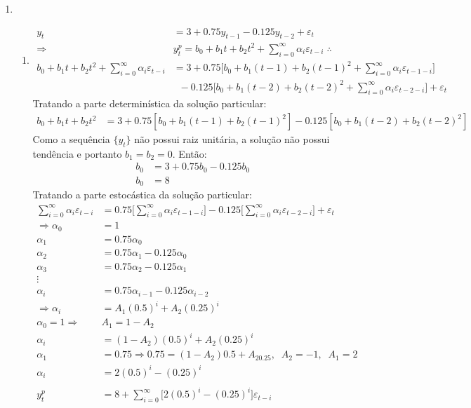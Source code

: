 \begin{enumerate}
		\begin{enumerate}
			\item %
				\begin{enumerate}
					\item %
					\begin{align*}
						y_t&=3+0.75y_{t-1}-0.125y_{t-2}+\varepsilon_t\\
						\Rightarrow & y_t^p=b_0+b_1t+b_2t^2+\sum\limits_{i=0}^{\infty}\alpha_i\varepsilon_{t-i}\;\therefore\\
						b_0+b_1t+b_2t^2+\sum\limits_{i=0}^{\infty}\alpha_i\varepsilon_{t-i}&=3+0.75\Bigg[b_0+b_1(t-1)+b_2(t-1)^2+\sum\limits_{i=0}^{\infty}\alpha_i\varepsilon_{t-1-i}\Bigg]\\
						&\;\;-0.125\Bigg[b_0+b_1(t-2)+b_2(t-2)^2+\sum\limits_{i=0}^{\infty}\alpha_i\varepsilon_{t-2-i}\Bigg]+\varepsilon_t						
					\end{align*}
					Tratando a parte determinística da solução particular:
					\begin{align*}
							b_0+b_1t+b_2t^2&=3+0.75[b_0+b_1(t-1)+b_2(t-1)^2]-0.125[b_0+b_1(t-2)+b_2(t-2)^2]
					\end{align*}
					Como a sequência $\{y_t\}$ não possui raiz unitária, a solução não possui tendência e portanto $b_1=b_2=0$. Então:
					\begin{align*}
						b_0&=3+0.75b_0-0.125b_0\\
						b_0&=8
					\end{align*}
					Tratando a parte estocástica da solução particular:
					\begin{align*}
						\sum\limits_{i=0}^{\infty}\alpha_i\varepsilon_{t-i}&=0.75\Bigg[\sum\limits_{i=0}^{\infty}\alpha_i\varepsilon_{t-1-i}\Bigg]
						-0.125\Bigg[\sum\limits_{i=0}^{\infty}\alpha_i\varepsilon_{t-2-i}\Bigg]+\varepsilon_t\\
					\Rightarrow \alpha_0&=1\\
					\alpha_1&=0.75\alpha_0\\
					\alpha_2&=0.75\alpha_1-0.125\alpha_0\\
					\alpha_3&=0.75\alpha_2-0.125\alpha_1\\
					\vdots&\\
					\alpha_i&=0.75\alpha_{i-1}-0.125\alpha_{i-2}\\
					\Rightarrow \alpha_i&=A_1(0.5)^i+A_2(0.25)^i\\
					\alpha_0=1 \Rightarrow&A_1=1-A_2\\
					\alpha_i&=(1-A_2)(0.5)^i+A_2(0.25)^i\\
					\alpha_1&=0.75\Rightarrow 0.75=(1-A_2)0.5+A_20.25, \;\;A_2=-1, \;\;A_1=2\\
					\alpha_i&=2(0.5)^i-(0.25)^i\\
					\\
					y_t^p&=8+\sum\limits_{i=0}^{\infty}\bigg[2(0.5)^i-(0.25)^i\bigg]\varepsilon_{t-i}
				\end{align*}
					

\end{enumerate}
\end{enumerate}
\end{enumerate}
